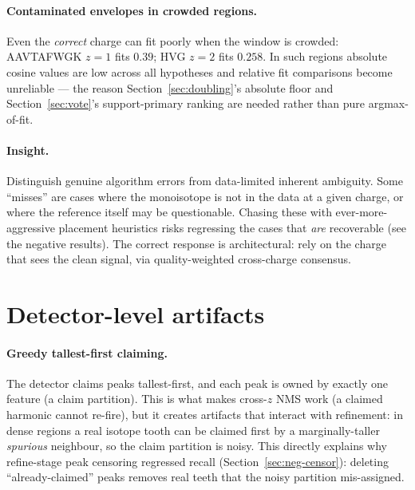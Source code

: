 \documentclass[11pt]{article}
\newcommand{\zeq}[1]{\ensuremath{z{=}#1}}
\begin{document}
\paragraph{Contaminated envelopes in crowded regions.} Even the \emph{correct} charge can fit
poorly when the window is crowded: AAVTAFWGK \zeq{1} fits $0.39$; HVG \zeq{2} fits $0.258$. In such
regions absolute cosine values are low across all hypotheses and relative fit comparisons become
unreliable --- the reason Section~\ref{sec:doubling}'s absolute floor and Section~\ref{sec:vote}'s
support-primary ranking are needed rather than pure argmax-of-fit.

\paragraph{Insight.} Distinguish genuine algorithm errors from data-limited inherent ambiguity.
Some ``misses'' are cases where the monoisotope is not in the data at a given charge, or where the
reference itself may be questionable. Chasing these with ever-more-aggressive placement heuristics
risks regressing the cases that \emph{are} recoverable (see the negative results). The correct
response is architectural: rely on the charge that sees the clean signal, via quality-weighted
cross-charge consensus.

\section{Detector-level artifacts}
\label{sec:detector}

\paragraph{Greedy tallest-first claiming.} The detector claims peaks tallest-first, and each peak
is owned by exactly one feature (a claim partition). This is what makes cross-$z$ NMS work
(a claimed harmonic cannot re-fire), but it creates artifacts that interact with refinement: in
dense regions a real isotope tooth can be claimed first by a marginally-taller \emph{spurious}
neighbour, so the claim partition is noisy. This directly explains why refine-stage peak censoring
regressed recall (Section~\ref{sec:neg-censor}): deleting ``already-claimed'' peaks removes real
teeth that the noisy partition mis-assigned.
\end{document}
